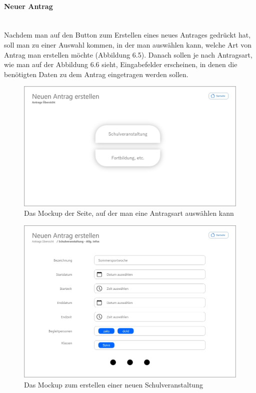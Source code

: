 \paragraph{Neuer Antrag}
~\\
Nachdem man auf den Button zum Erstellen eines neues Antrages gedrückt hat, soll man zu einer Auswahl kommen, in der man auswählen kann, welche Art von Antrag man erstellen möchte (Abbildung 6.5). Danach sollen je nach Antragsart, wie man auf der Abbildung 6.6 sieht, Eingabefelder erscheinen, in denen die benötigten Daten zu dem Antrag eingetragen werden sollen.
\begin{figure}[H]
	\centering
	\includegraphics[width=1\linewidth]{images/Mockup-Neuer-Antrag}
	\caption[Mockup neuer Antrag]{Das Mockup der Seite, auf der man eine Antragsart auswählen kann}
	\label{fig:mockupNeu}
\end{figure}
\begin{figure}[H]
	\centering
	\includegraphics[width=1\linewidth]{images/Mockup-Antrag-erstellen}
	\caption[Mockup Antrag erstellen]{Das Mockup zum erstellen einer neuen Schulveranstaltung}
	\label{fig:mockupErstellen}
\end{figure}
